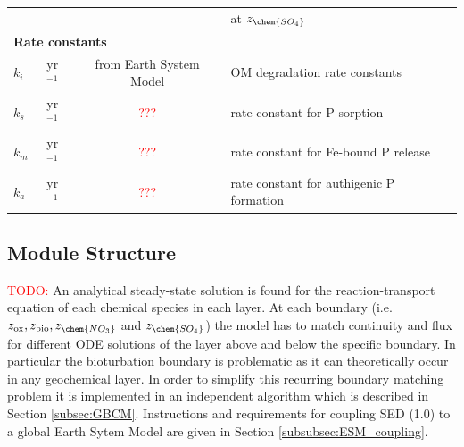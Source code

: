 \documentclass[gmd, manuscript]{copernicus}
\begin{document}
\begin{table}[btp]
\begin{tabular}{l c c l}
& & & at $z_{\chem{SO_4}}$\\
\multicolumn{4}{l}{\textbf{Rate constants}}\\
$k_i$ & yr$^{-1}$ & from Earth System Model & OM degradation rate constants\\
$k_s$ & yr$^{-1}$ & \textcolor{red}{???} & rate constant for P sorption\\
$k_m$ & yr$^{-1}$ & \textcolor{red}{???} & rate constant for Fe-bound P release\\
$k_a$ & yr$^{-1}$ & \textcolor{red}{???} & rate constant for authigenic P formation\\
\hline\hline
\end{tabular}
\label{table:reaction_parameters}
\end{table}

\subsection{Module Structure}
\textcolor{red}{TODO: }
An analytical steady-state solution is found for the reaction-transport equation of each chemical species in each layer. 
At each boundary (i.e. $z_{\mathrm{ox}}, z_{\mathrm{bio}}, z_{\chem{NO_3}}$ and $z_{\chem{SO_4}}$) the model has to match continuity and flux for different ODE solutions of the layer above and below the specific boundary. 
In particular the bioturbation boundary is problematic as it can theoretically occur in any geochemical layer. In order to simplify this recurring boundary matching problem it is implemented in an independent algorithm 
which is described in Section \ref{subsec:GBCM}. Instructions and requirements for coupling SED (1.0) to a global Earth Sytem Model are given in Section \ref{subsubsec:ESM_coupling}.
\end{document}
